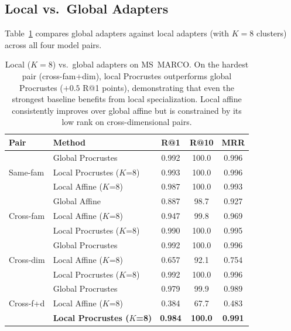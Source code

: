 \documentclass[11pt,a4paper]{article}
\begin{document}
\subsection{Local vs.\ Global Adapters}
\label{sec:results:local}

Table~\ref{tab:local} compares global adapters against local adapters (with $K = 8$ clusters) across all four model pairs.

\begin{table}[t]
\centering
\small
\setlength{\tabcolsep}{4pt}
\begin{tabular}{@{}llccc@{}}
\toprule
\textbf{Pair} & \textbf{Method} & \textbf{R@1} & \textbf{R@10} & \textbf{MRR} \\
\midrule
\multirow{3}{*}{\scriptsize Same-fam}
  & Global Procrustes              & 0.992 & 100.0 & 0.996 \\
  & Local Procrustes ($K$=8)       & 0.993 & 100.0 & 0.996 \\
  & Local Affine ($K$=8)           & 0.987 & 100.0 & 0.993 \\
\midrule
\multirow{3}{*}{\scriptsize Cross-fam}
  & Global Affine                  & 0.887 & 98.7  & 0.927 \\
  & Local Affine ($K$=8)           & 0.947 & 99.8  & 0.969 \\
  & Local Procrustes ($K$=8)       & 0.990 & 100.0 & 0.995 \\
\midrule
\multirow{3}{*}{\scriptsize Cross-dim}
  & Global Procrustes              & 0.992 & 100.0 & 0.996 \\
  & Local Affine ($K$=8)           & 0.657 & 92.1  & 0.754 \\
  & Local Procrustes ($K$=8)       & 0.992 & 100.0 & 0.996 \\
\midrule
\multirow{3}{*}{\scriptsize Cross-f+d}
  & Global Procrustes              & 0.979 & 99.9  & 0.989 \\
  & Local Affine ($K$=8)           & 0.384 & 67.7  & 0.483 \\
  & \textbf{Local Procrustes ($K$=8)} & \textbf{0.984} & \textbf{100.0}  & \textbf{0.991} \\
\bottomrule
\end{tabular}
\caption{Local ($K=8$) vs.\ global adapters on MS~MARCO. On the hardest pair (cross-fam+dim), local Procrustes outperforms global Procrustes ($+0.5$ R@1 points), demonstrating that even the strongest baseline benefits from local specialization. Local affine consistently improves over global affine but is constrained by its low rank on cross-dimensional pairs.}
\label{tab:local}
\end{table}
\end{document}
